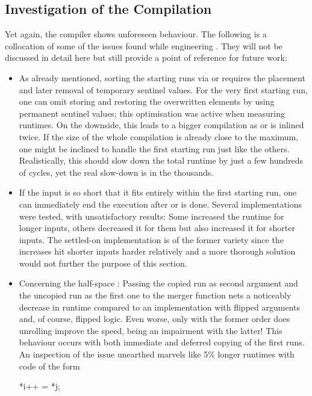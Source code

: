 \subsection*{Investigation of the Compilation}
\label{sec:tasklet:merge:compilation}

Yet again, the compiler shows unforeseen behaviour.
The following is a collocation of some of the issues found while engineering \MS{}.
They will not be discussed in detail here but still provide a point of reference for future work:
\begin{itemize}
	\item
	As already mentioned, sorting the starting runs via \IS{} or \ShS{} requires the placement and later removal of temporary sentinel values.
	For the very first starting run, one can omit storing and restoring the overwritten elements by using permanent sentinel values;
	this optimisation was active when measuring runtimes.
	On the downside, this leads to a bigger compilation as \IS{} or \ShS{} is inlined twice.
	If the size of the whole compilation is already close to the maximum, one might be inclined to handle the first starting run just like the others.
	Realistically, this should slow down the total runtime by just a few hundreds of cycles, yet the real slow-down is in the thousands.

	\item
	If the input is so short that it fits entirely within the first starting run, one can immediately end the execution after \IS{} or \ShS{} is done.
	Several implementations were tested, with unsatisfactory results:
	Some increased the runtime for longer inputs, others decreased it for them but also increased it for shorter inputs.
	The settled-on implementation is of the former variety since the increases hit shorter inputs harder relatively and a more thorough solution would not further the purpose of this section.

	\item
	Concerning the half-space \MS{}:
	Passing the copied run as second argument and the uncopied run as the first one to the merger function nets a noticeably decrease in runtime compared to an implementation with flipped arguments and, of course, flipped logic.
	Even worse, only with the former order does unrolling improve the speed, being an impairment with the latter!
	This behaviour occurs with both immediate and deferred copying of the first runs.
	An inspection of the issue unearthed marvels like 5\% longer runtimes with code of the form
	{  %
		\par
		\centering
		\begin{minipage}{10cm}
			\centering
			\begin{minipage}{ \widthof{\ttfamily a = b - i;} }
				\ttfamily
				*i++ = *j;


\end{minipage}
\end{minipage}}
\end{itemize}
